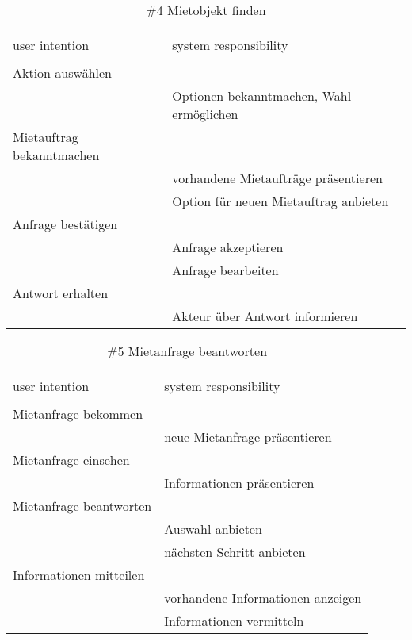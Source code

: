 \begin{table}[H]
\caption{\#4 Mietobjekt finden }
\centering
\begin{tabular}{l l}
\\ [-0.5ex]

\hline\hline
\\ [-0.5ex]
user intention & system responsibility
\\ [1.5ex]
\hline
\\ [-0.5ex]
Aktion auswählen 			& 											 \\[1ex]
							& Optionen bekanntmachen, Wahl ermöglichen	 \\[1ex]
Mietauftrag bekanntmachen	& 											 \\[1ex]
							& vorhandene Mietaufträge präsentieren		 \\[1ex]
							& Option für neuen Mietauftrag anbieten      \\[1ex]
Anfrage bestätigen   		& 											 \\[1ex] 
							& Anfrage akzeptieren						 \\[1ex]
							& Anfrage bearbeiten \\[1ex]
Antwort erhalten			& 											 \\[1ex]
							& Akteur über Antwort informieren			 \\[1ex]

\hline
\end{tabular}
\label{tab:mietobjekt}
\end{table}

\begin{table}[H]
\caption{\#5 Mietanfrage beantworten }
\centering
\begin{tabular}{l l}
\\ [-0.5ex]

\hline\hline
\\ [-0.5ex]
user intention & system responsibility
\\ [1.5ex]
\hline
\\ [-0.5ex]
Mietanfrage bekommen 		& 											 \\[1ex]
							& neue Mietanfrage präsentieren				 \\[1ex]
Mietanfrage einsehen		& 											 \\[1ex]
							& Informationen präsentieren				 \\[1ex]
Mietanfrage beantworten  	& 											 \\[1ex] 
							& Auswahl anbieten							 \\[1ex]
							& nächsten Schritt anbieten					 \\[1ex]
Informationen mitteilen		& 											 \\[1ex]
							& vorhandene Informationen anzeigen			 \\[1ex]
							& Informationen vermitteln					 \\[1ex]


\hline
\end{tabular}
\label{tab:mietanfrage}
\end{table}

